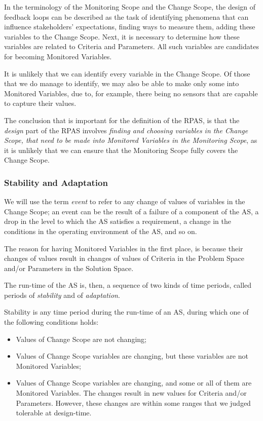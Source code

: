 \documentclass[graybox]{svmult}
\newcommand{\zi}[1]{\textit{#1}}
\newcommand{\AS}{AS}
\newcommand{\RPAS}{RPAS}
\newcommand{\SolutionSpace}{Solution Space}
\newcommand{\ProblemSpace}{Problem Space}
\newcommand{\Criteria}{Criteria}
\newcommand{\Parameter}{Parameter}
\newcommand{\MonitoringScope}{Monitoring Scope}
\newcommand{\ChangeScope}{Change Scope}
\newcommand{\MonitoredVariable}{Monitored Variable}
\begin{document}
In the terminology of the \MonitoringScope{} and the \ChangeScope, the design of feedback loops can be described as the task of identifying phenomena that can influence stakeholders' expectations, finding ways to measure them, adding these variables to the \ChangeScope. Next, it is necessary to determine how these variables are related to \Criteria{} and \Parameter s. All such variables are candidates for becoming \MonitoredVariable s. 

It is unlikely that we can identify every variable in the \ChangeScope. Of those that we do manage to identify, we may also be able to make only some into \MonitoredVariable s, due to, for example, there being no sensors that are capable to capture their values.

The conclusion that is important for the definition of the \RPAS, is that the \zi{design} part of the \RPAS{} involves \zi{finding and choosing variables in the \ChangeScope, that need to be made into \MonitoredVariable s in the \MonitoringScope{}}, as it is unlikely that we can ensure that the \MonitoringScope{} fully covers the \ChangeScope. 

%
\subsubsection{Stability and Adaptation}\label{s:rpas:premises:adaptation}
We will use the term \zi{event} to refer to any change of values of variables in the \ChangeScope; an event can be the result of a failure of a component of the \AS, a drop in the level to which the \AS{} satisfies a requirement, a change in the conditions in the operating environment of the \AS, and so on.

The reason for having \MonitoredVariable s in the first place, is because their changes of values result in changes of values of \Criteria{} in the \ProblemSpace{} and/or \Parameter s in the \SolutionSpace.

The run-time of the \AS{} is, then, a sequence of two kinds of time periods, called periods of \zi{stability} and of \zi{adaptation}. 

Stability is any time period during the run-time of an \AS, during which one of the following conditions holds:
\begin{itemize}
    \item{Values of \ChangeScope{} are not changing;}
    \item{Values of \ChangeScope{} variables are changing, but these variables are not \MonitoredVariable s;}
    \item{Values of \ChangeScope{} variables are changing, and some or all of them are \MonitoredVariable s. The changes result in new values for \Criteria{} and/or \Parameter s. However, these changes are within some ranges that we judged tolerable at design-time.}
\end{itemize}
\end{document}
